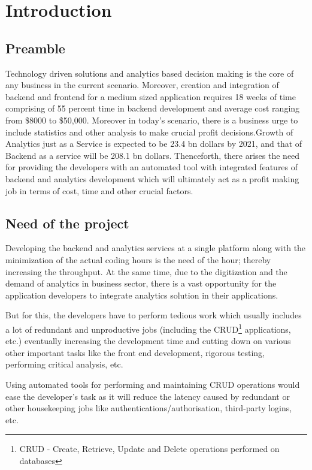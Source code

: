 \documentclass[a4paper,12pt]{report}
\begin{document}
    \newpage
    \tableofcontents{}    


    \chapter {Introduction}    
    \section{Preamble}
    \label{sec:introduction}    
    Technology driven solutions and analytics based decision making is the core of any business in the current scenario. Moreover, creation and integration of backend and frontend for a medium sized application requires 18 weeks of time comprising of 55 percent time in backend development and average cost ranging from \$8000 to \$50,000.  Moreover in today’s scenario, there is a business urge to include statistics and other analysis to make crucial profit decisions.Growth of Analytics just as a Service is expected to be  23.4 bn dollars by 2021, and that of Backend as a service will be 208.1 bn dollars. Thenceforth, there arises the need for providing the developers with an automated tool with integrated features of backend and analytics development which will ultimately act as a profit making job in terms of cost, time and other crucial factors.
    
    \section{Need of the project}
    \label{sec:theory}
    Developing the backend and analytics services at a single platform along with the minimization of the actual coding hours is the need of the hour; thereby increasing the throughput. At the same time, due to the digitization and the demand of analytics in business sector, there is a vast opportunity for the application developers to integrate analytics solution in their applications. 
    
    But for this, the developers have to perform tedious work which usually includes a lot of redundant and unproductive jobs (including the CRUD\footnote{ CRUD - Create, Retrieve, Update and Delete operations performed on databases } applications, etc.)  eventually increasing the development time and cutting down on various other important tasks like the front end development, rigorous testing, performing critical analysis, etc. 
    
    Using automated tools for performing and maintaining CRUD operations would ease the developer's task as it will reduce the latency caused by redundant or other housekeeping jobs like authentications/authorisation, third-party logins, etc.
    
\end{document}
